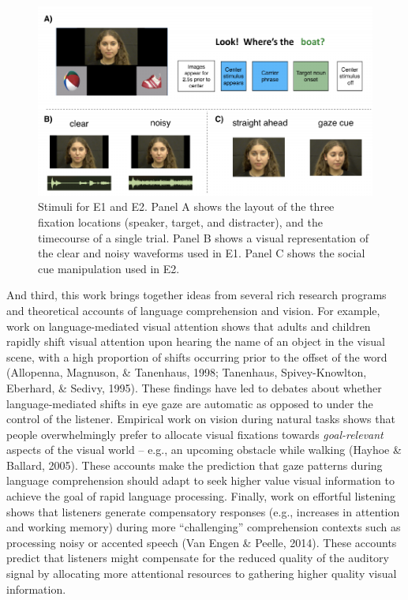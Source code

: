 \documentclass[10pt, letterpaper]{article}
\newenvironment{CodeChunk}{}{}
\begin{document}
\begin{CodeChunk}
\begin{figure}[tb]

{\centering \includegraphics[width=0.7\linewidth]{figs/stimuli-1} 

}

\caption[Stimuli for E1 and E2]{Stimuli for E1 and E2. Panel A shows the layout of the three fixation locations (speaker, target, and distracter), and the timecourse of a single trial. Panel B shows a visual representation of the clear and noisy waveforms used in E1. Panel C shows the social cue manipulation used in E2.}\label{fig:stimuli}
\end{figure}
\end{CodeChunk}

And third, this work brings together ideas from several rich research
programs and theoretical accounts of language comprehension and vision.
For example, work on language-mediated visual attention shows that
adults and children rapidly shift visual attention upon hearing the name
of an object in the visual scene, with a high proportion of shifts
occurring prior to the offset of the word (Allopenna, Magnuson, \&
Tanenhaus, 1998; Tanenhaus, Spivey-Knowlton, Eberhard, \& Sedivy, 1995).
These findings have led to debates about whether language-mediated
shifts in eye gaze are automatic as opposed to under the control of the
listener. Empirical work on vision during natural tasks shows that
people overwhelmingly prefer to allocate visual fixations towards
\emph{goal-relevant} aspects of the visual world -- e.g., an upcoming
obstacle while walking (Hayhoe \& Ballard, 2005). These accounts make
the prediction that gaze patterns during language comprehension should
adapt to seek higher value visual information to achieve the goal of
rapid language processing. Finally, work on effortful listening shows
that listeners generate compensatory responses (e.g., increases in
attention and working memory) during more ``challenging'' comprehension
contexts such as processing noisy or accented speech (Van Engen \&
Peelle, 2014). These accounts predict that listeners might compensate
for the reduced quality of the auditory signal by allocating more
attentional resources to gathering higher quality visual information.
\end{document}
